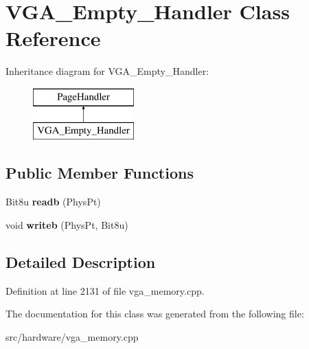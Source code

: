 \hypertarget{classVGA__Empty__Handler}{\section{V\-G\-A\-\_\-\-Empty\-\_\-\-Handler Class Reference}
\label{classVGA__Empty__Handler}
}
Inheritance diagram for V\-G\-A\-\_\-\-Empty\-\_\-\-Handler\-:\begin{figure}[H]
\begin{center}
\leavevmode
\includegraphics[height=2.000000cm]{classVGA__Empty__Handler}
\end{center}
\end{figure}
\subsection*{Public Member Functions}
\begin{DoxyCompactItemize}
\item 
\hypertarget{classVGA__Empty__Handler_a24a79290a9c8f8f1c82b5f5c15dbb59f}{Bit8u {\bfseries readb} (Phys\-Pt)}\label{classVGA__Empty__Handler_a24a79290a9c8f8f1c82b5f5c15dbb59f}

\item 
\hypertarget{classVGA__Empty__Handler_a2e5f70a97bcb92d068b65e7d47138dd7}{void {\bfseries writeb} (Phys\-Pt, Bit8u)}\label{classVGA__Empty__Handler_a2e5f70a97bcb92d068b65e7d47138dd7}

\end{DoxyCompactItemize}


\subsection{Detailed Description}


Definition at line 2131 of file vga\-\_\-memory.\-cpp.



The documentation for this class was generated from the following file\-:\begin{DoxyCompactItemize}
\item 
src/hardware/vga\-\_\-memory.\-cpp\end{DoxyCompactItemize}
